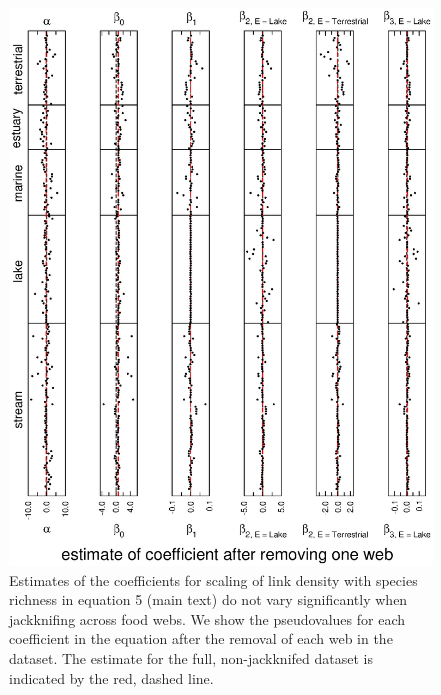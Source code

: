 \documentclass[12pt]{article}
\begin{document}
    \begin{figure}[!h]
    \centerline{\includegraphics*[height=.75\textheight]{Figures/Jackknife/LS_web.eps}}
    \caption{Estimates of the coefficients for scaling of link density with species richness
    in equation 5 (main text) do not vary significantly when jackknifing across food webs. 
    We show the pseudovalues for each coefficient in the equation after the removal of each 
    web in the dataset. The estimate for the full, non-jackknifed dataset is indicated by 
    the red, dashed line.}
    \label{LS_web}
    \end{figure}

  \newpage
\end{document}

